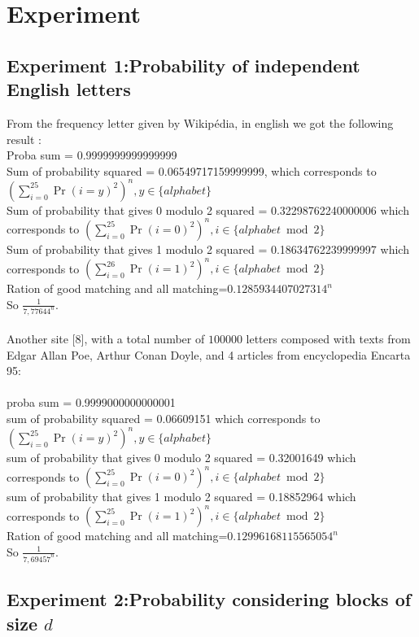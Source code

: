 \documentclass{article}
\begin{document}
\section{Experiment}

\subsection{Experiment 1:Probability of independent English letters}
From the frequency letter given by Wikip\'edia, in english we got the following result :\\
Proba sum = 0.9999999999999999\\
Sum of probability squared = 0.06549717159999999, which corresponds to $(\sum_{i=0}^{25}{\Pr(i=y)^2})^n, y \in \{alphabet\} $\\
Sum of probability that gives 0 modulo 2 squared  = 0.32298762240000006 which corresponds to $(\sum_{i=0}^{25}{\Pr(i=0)^2})^n, i \in \{alphabet \bmod 2\} $\\
Sum of probability that gives 1 modulo 2 squared = 0.18634762239999997 which corresponds to $(\sum_{i=0}^{26}{\Pr(i=1)^2})^n, i \in \{alphabet \bmod 2\} $\\
Ration of good matching and all matching=$0.1285934407027314^n$\\
So $\frac{1}{7,77644^n}$.
\\
\\
Another site [8], with a total number of $100000$ letters composed with texts from Edgar Allan Poe, Arthur Conan Doyle, and 4 articles from encyclopedia Encarta 95:\\
\\
proba sum = 0.9999000000000001\\
sum of probability squared = 0.06609151 which corresponds to $(\sum_{i=0}^{25}{\Pr(i=y)^2})^n, y \in \{alphabet\} $\\
sum of probability that gives 0 modulo 2 squared = 0.32001649 which corresponds to $(\sum_{i=0}^{25}{\Pr(i=0)^2})^n, i \in \{alphabet \bmod 2\} $\\
sum of probability that gives 1 modulo 2 squared = 0.18852964 which corresponds to $(\sum_{i=0}^{25}{\Pr(i=1)^2})^n, i \in \{alphabet \bmod 2\} $\\
Ration of good matching and all matching=$0.12996168115565054^n$\\
So $\frac{1}{7,69457^n}$.

\subsection{Experiment 2:Probability considering blocks of size $d$}
\end{document}
